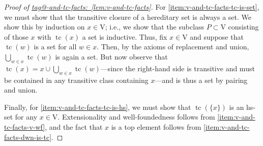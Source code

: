 \documentclass{amsart}
\makeatletter
\newcommand\rV{\mathrm{V}}
\newcommand\set[2][]{#1\{ #2 #1\}}
\newcommand\tc{\operatorname{tc}}
\newcommand\tagword[1]{\csname tag@#1\endcsname}
\def\label@tag#1:#2\@nil{#1}
\newcommand\labeltag[1]{\label@tag#1:\@nil}
\newcommand\jref[1]{%
  \texorpdfstring%
    {\hyperref[#1]{\tagword{\labeltag{#1}}~\ref*{#1}}}%
    {\tagword{\labeltag{#1}}~\ref*{#1}}%
}
\theoremstyle{definition}
\theoremstyle{remark}
\theoremstyle{plainwithref}
\newenvironment{settybox}{\begin{tcolorbox}[colback=blue!20,breakable%
    ,enhanced%
    ,sharp corners%
    ,frame hidden%
    ,boxsep=0pt
    ,left=5pt,right=5pt,top=5pt,bottom=5pt
    ,enlarge left by=-5pt,width=\linewidth+10pt
    ,enlarge top by=5pt,enlarge bottom by=5pt
    ,before skip balanced=0pt,after skip balanced=0pt
    ]}{\end{tcolorbox}}
\makeatother
\begin{document}
\begin{settybox}
\begin{proof}[Proof of \jref{lem:v-and-tc-facts}]
    For \ref{item:v-and-tc-facts-tc-is-set}, we must show that the transitive closure of a hereditary set is always a set.
    We show this by induction on \( x \in \rV \); i.e., we show that the subclass \( P \subset \rV \) consisting of those \( x \) with \( \tc(x) \) a set is inductive.
    Thus, fix \( x \in \rV \) and suppose that \( \tc(w) \) is a set for all \( w \in x \).
    Then, by the axioms of replacement and union, \( \bigcup_{w \in x} \tc(w) \) is again a set.
    But now observe that \( \tc(x) = x \cup \bigcup_{w \in x} \tc(w) \)---since the right-hand side is transitive and must be contained in any transitive class containing \( x \)---and is thus a set by pairing and union.

    Finally, for \ref{item:v-and-tc-facts-tc-is-hs}, we must show that \( \tc(\set{x}) \) is an hs-set for any \( x \in \rV \).
    Extensionality and well-foundedness follows from \ref{item:v-and-tc-facts-v-wf}, and the fact that \( x \) is a top element follows from \ref{item:v-and-tc-facts-dwn-is-tc}.
  \end{proof}
\end{settybox}
\end{document}
